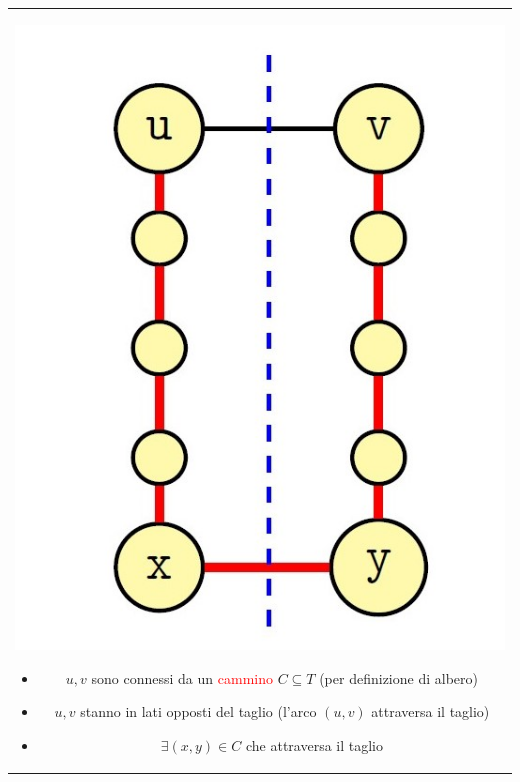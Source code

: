 \documentclass[../cheatSheetAlgoritmi.tex]{subfiles}
\begin{document}
\begin{table}[t] 
\begin{tabular}{@{}c@{}} %
\begin{minipage}{0.3\textwidth}
\includegraphics[width=\linewidth]{../img/Greedy_5.jpg}
\end{minipage}
\hfill
\begin{minipage}{0.6\textwidth}\raggedleft
\begin{itemize}
	\item $u, v$ sono connessi da un \textcolor{red}{cammino} $C \subseteq T$ (per definizione di albero)
	\item $u, v$ stanno in lati opposti del taglio (l'arco $(u, v)$ attraversa il taglio)
	\item $\exists (x, y) \in C$ che attraversa il taglio
\end{itemize}
\end{minipage} \\


\end{tabular}
\end{table}
\end{document}
